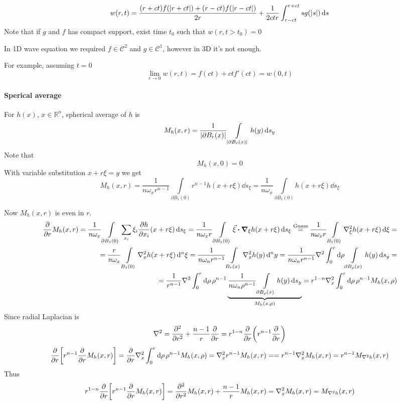 $$w(r,t) = \frac{(r+ct)f(\abs{r+ct})+ (r-ct)f(\abs{r-ct})}{2r} + \frac{1}{2ctr} \int_{r-ct}^{r+ct} sg(\abs{s}) \dd{s}$$ 
Note that if $g$ and $f$ has compact support, exist time $t_0$ such that
$w(r,t>t_0) = 0$

In 1D wave equation we required $f\in \mathcal{C}^2$ and $g\in \mathcal{C}^1$, however in 3D it's not enough.

For example, assuming $t=0$
$$\lim_{r\to0} w(r,t) = f(ct) + ctf'(ct) = w(0,t)$$

\paragraph{Sperical average}
For $h(x)$, $x\in \mathbb{R}^n$, spherical average of $h$ is
$$M_h(x,r) = \frac{1}{\abs{\partial B_r(x)}} \int\limits_{\abs{\partial B_r(x)}} h(y) \dd{s_y}$$
Note that
$$M_h(x,0) = 0$$
With variable substitution $x+r\xi = y$ we get
$$M_h(x,r) = \frac{1}{n\omega_x r^{n-1}} \int\limits_{\partial B_1(0)} r^{n-1}h(x+r\xi) \dd{s_\xi}= \frac{1}{n\omega_x } \int\limits_{\partial B_1(0)} h(x+r\xi) \dd{s_\xi}$$

Now $M_h(x,r)$ is even in $r$.
\begin{align*}
\pdv{r} M_h(x,r) = \frac{1}{n\omega_x } \int\limits_{\partial B_1(0)}  \sum_{x_i} \xi_i \pdv{h}{x_i}  \qty(x+r\xi) \dd{s_\xi} = \frac{1}{n\omega_x r} \int\limits_{\partial B_1(0)}  \va{\xi} \vdot \grad_{\xi}{h(x+r\xi)} \dd{s_\xi} \stackrel{\text{Guass}}{=} \frac{1}{n\omega_x r} \int\limits_{ B_1(0)}  \laplacian_{\xi}{h(x+r\xi)} \dd{\xi} =\\= \frac{r}{n\omega_x } \int\limits_{ B_1(0)}  \laplacian_{x}{h(x+r\xi)} \dd[n]{\xi} = \frac{1}{n\omega_n r^{n-1}}\int\limits_{ B_r(x)}  \laplacian_x{h(y)} \dd[n]{y} = \frac{1}{n\omega_n r^{n-1}}\laplacian\int_0^r \dd{\rho}\int\limits_{ \partial B_\rho(x)}  h(y) \dd{s_y} =\\= \frac{1}{ r^{n-1}}\laplacian\int_0^r \dd{\rho} \rho^{n-1}\underbrace{\frac{1}{n\omega_n \rho^{n-1}}\int\limits_{ \partial B_\rho(x)}  h(y) \dd{s_y} }_{M_h(x,\rho)} = r^{1-n} \laplacian_x \int_0^r \dd{\rho} \rho^{n-1} M_h(x,\rho)
\end{align*}
Since radial Laplacian is
$$\laplacian = \pdv[2]{r} + \frac{n-1}{r} \pdv{r} = r^{1-n} \pdv{r} \qty(r^{n-1}\pdv{r})$$
$$\pdv{r} \qty[r^{n-1} \pdv{r} M_h(x,r)] = \pdv{r} \laplacian_x \int_0^r \dd{\rho} \rho^{n-1} M_h(x,\rho) = \laplacian_x r^{n-1} M_h(x,r) = = r^{n-1} \laplacian_x M_h(x,r) = r^{n-1} M_{\laplacian h} (x,r) $$
Thus
$$r^{1-n} \pdv{r} \qty[r^{n-1} \pdv{r} M_h(x,r)] = \pdv[2]{r} M_h(x,r) + \frac{n-1}{r}M_{h}(x,r) = \laplacian_x M_h(x,r) = M_{\laplacian{h} } (x,r)$$

